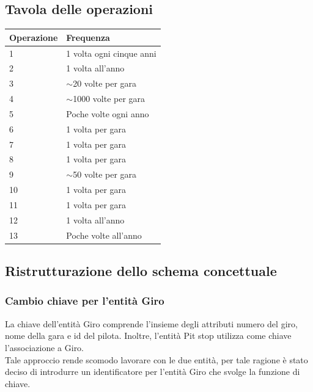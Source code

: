 \documentclass[11pt]{article}
\begin{document}
\subsection{Tavola delle operazioni}
\begin{center}
    \begin{tabular}{ |l|l| }
        \hline
        \textbf{Operazione} & \textbf{Frequenza} \\

        \hline
        1 & 1 volta ogni cinque anni \\
        \hline
        2 & 1 volta all'anno \\
        \hline
        3 & $\sim$20 volte per gara \\
        \hline
        4 & $\sim$1000 volte per gara \\
        \hline
        5 & Poche volte ogni anno \\
        \hline
        6 & 1 volta per gara \\
        \hline
        7 & 1 volta per gara \\
        \hline
        8 & 1 volta per gara \\
        \hline
        9 & $\sim$50 volte per gara \\
        \hline
        10 & 1 volta per gara \\
        \hline
        11 & 1 volta per gara \\
        \hline
        12 & 1 volta all'anno \\
        \hline
        13 & Poche volte all'anno \\
        \hline
    \end{tabular}
\end{center}

\subsection{Ristrutturazione dello schema concettuale}
\subsubsection{Cambio chiave per l'entità Giro}
La chiave dell'entità Giro comprende l'insieme degli attributi numero del giro, nome della gara e id del pilota. Inoltre, l'entità Pit stop utilizza come chiave l'associazione a Giro.\\
Tale approccio rende scomodo lavorare con le due entità, per tale ragione è stato deciso di introdurre un identificatore per l'entità Giro che svolge la funzione di chiave.
\end{document}
